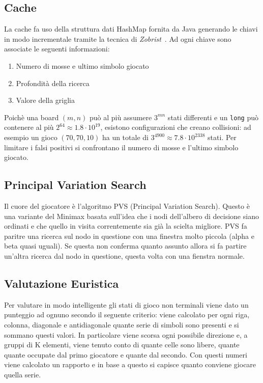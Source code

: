 \documentclass{article}
\begin{document}
\subsection{Cache}
La cache fa uso della struttura dati HashMap fornita da Java generando le chiavi 
in modo incrementale tramite la tecnica di \emph{Zobrist}~\cite{zobrist}. Ad ogni
chiave sono associate le seguenti informazioni:
\begin{enumerate}
  \item Numero di mosse e ultimo simbolo giocato
  \item Profondit\`a della ricerca
  \item Valore della griglia
\end{enumerate}
Poich\`e una board $(m,n)$ pu\`o al pi\`u assumere $3^{mn}$ stati differenti e
un \verb!long! pu\`o contenere al pi\`u $2^{64} \approx 1.8 \cdot 10^{19}$,
esistono configurazioni che creano collisioni: ad esempio un gioco $(70, 70, 10)$
ha un totale di $3^{4900} \approx 7.8 \cdot 10^{2338}$ stati. Per limitare i
falsi positivi si confrontano il numero di mosse e l'ultimo simbolo giocato. %

\subsection{Principal Variation Search}
Il cuore del giocatore è l'algoritmo PVS (Principal Variation Search). Questo è 
una variante del Minimax basata sull'idea che i nodi dell'albero di decisione 
siano ordinati e che quello in visita correntemente sia gi\`a la scielta migliore.
PVS fa paritre una ricerca sul nodo in questione con una finestra molto piccola 
(alpha e beta quasi uguali). Se questa non conferma quanto assunto allora si fa
partire un'altra ricerca dal nodo in questione, questa volta con una fienstra 
normale.

\subsection{Valutazione Euristica}
Per valutare in modo intelligente gli stati di gioco non terminali viene dato un 
punteggio ad ognuno secondo il seguente criterio: viene calcolato per
ogni riga, colonna, diagonale e antidiagonale quante serie di simboli sono presenti
e si sommano questi valori. In particolare viene scorsa ogni possibile direzione e,
a gruppi di K elementi, viene tenuto conto di quante celle sono libere, quante
quante occupate dal primo giocatore e quante dal secondo. Con questi numeri viene 
calcolato un rapporto e in base a questo si capisce quanto conviene giocare 
quella serie.

\pagebreak


\end{document}
